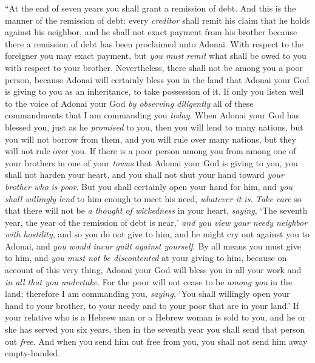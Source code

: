 \begin{biblechapter} %
\verse “At the end of seven years you shall grant a remission of debt.
\verse And this is the manner of the remission of debt: every \textit{creditor} shall remit his claim that he holds against his neighbor, and he shall not exact payment from his brother because there a remission of debt has been proclaimed unto Adonai.
\verse With respect to the foreigner you may exact payment, but \textit{you must remit} what shall be owed to you with respect to your brother.
\verse Nevertheless, there shall not be among you a poor person, because Adonai will certainly bless you in the land that Adonai your God is giving to you as an inheritance, to take possession of it.
\verse If only you listen well to the voice of Adonai your God \textit{by observing diligently} all of these commandments that I am commanding you \textit{today}.
\verse When Adonai your God has blessed you, just as he \textit{promised} to you, then you will lend to many nations, but you will not borrow from them, and you will rule over many nations, but they will not rule over you.
\verse If there is a poor person among you from among one of your brothers in one of your \textit{towns} that Adonai your God is giving to you, you shall not harden your heart, and you shall not shut your hand toward \textit{your brother who is poor}.
\verse But you shall certainly open your hand for him, and \textit{you shall willingly lend} to him enough to meet his need, \textit{whatever it is}.
\verse \textit{Take care} so that there will not be \textit{a thought of wickedness} in your heart, \textit{saying}, ‘The seventh year, the year of the remission of debt is near,’ \textit{and you view your needy neighbor with hostility}, and so you do not give to him, and he might cry out against you to Adonai, and \textit{you would incur guilt against yourself}.
\verse By all means you must give to him, and \textit{you must not be discontented} at your giving to him, because on account of this very thing, Adonai your God will bless you in all your work and \textit{in all that you undertake}.
\verse For the poor will not cease to be \textit{among you} in the land; therefore I am commanding you, \textit{saying}, ‘You shall willingly open your hand to your brother, to your needy and to your poor that are in your land.’
\verse If your relative who is a Hebrew man or a Hebrew woman is sold to you, and he or she has served you six years, then in the seventh year you shall send that person out \textit{free}.
\verse And when you send him out free from you, you shall not send him away empty-handed.

\end{biblechapter}
